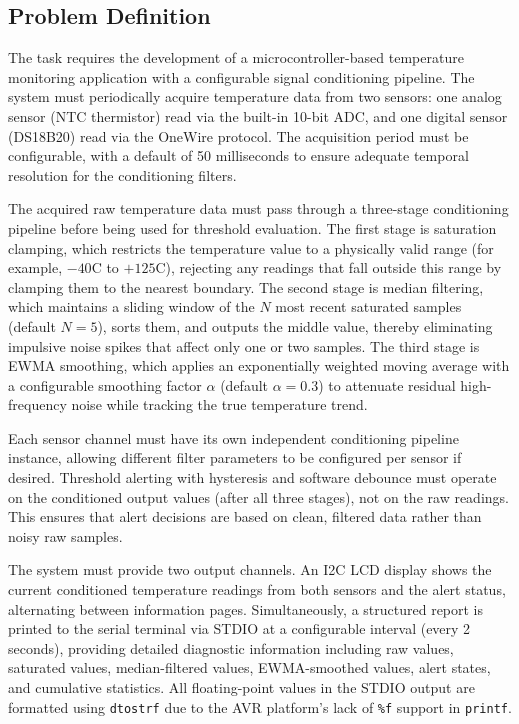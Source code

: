 \subsection{Problem Definition}

The task requires the development of a microcontroller-based temperature monitoring application with a configurable signal conditioning pipeline. The system must periodically acquire temperature data from two sensors: one analog sensor (NTC thermistor) read via the built-in 10-bit ADC, and one digital sensor (DS18B20) read via the OneWire protocol. The acquisition period must be configurable, with a default of 50 milliseconds to ensure adequate temporal resolution for the conditioning filters.

The acquired raw temperature data must pass through a three-stage conditioning pipeline before being used for threshold evaluation. The first stage is saturation clamping, which restricts the temperature value to a physically valid range (for example, $-40$\textdegree C to $+125$\textdegree C), rejecting any readings that fall outside this range by clamping them to the nearest boundary. The second stage is median filtering, which maintains a sliding window of the $N$ most recent saturated samples (default $N = 5$), sorts them, and outputs the middle value, thereby eliminating impulsive noise spikes that affect only one or two samples. The third stage is EWMA smoothing, which applies an exponentially weighted moving average with a configurable smoothing factor $\alpha$ (default $\alpha = 0.3$) to attenuate residual high-frequency noise while tracking the true temperature trend.

Each sensor channel must have its own independent conditioning pipeline instance, allowing different filter parameters to be configured per sensor if desired. Threshold alerting with hysteresis and software debounce must operate on the conditioned output values (after all three stages), not on the raw readings. This ensures that alert decisions are based on clean, filtered data rather than noisy raw samples.

The system must provide two output channels. An I2C LCD display shows the current conditioned temperature readings from both sensors and the alert status, alternating between information pages. Simultaneously, a structured report is printed to the serial terminal via STDIO at a configurable interval (every 2 seconds), providing detailed diagnostic information including raw values, saturated values, median-filtered values, EWMA-smoothed values, alert states, and cumulative statistics. All floating-point values in the STDIO output are formatted using \texttt{dtostrf} due to the AVR platform's lack of \texttt{\%f} support in \texttt{printf}.

